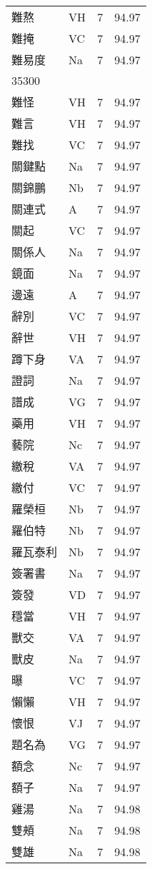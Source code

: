 \documentclass[twocolumn]{book}
\begin{document}
\begin{supertabular}{llrr}
難熬 & VH & 7 &  94.97\\
難掩 & VC & 7 &  94.97\\
難易度 & Na & 7 &  94.97\\
35300\\
難怪 & VH & 7 &  94.97\\
難言 & VH & 7 &  94.97\\
難找 & VC & 7 &  94.97\\
關鍵點 & Na & 7 &  94.97\\
關錦鵬 & Nb & 7 &  94.97\\
關連式 & A & 7 &  94.97\\
關起 & VC & 7 &  94.97\\
關係人 & Na & 7 &  94.97\\
鏡面 & Na & 7 &  94.97\\
邊遠 & A & 7 &  94.97\\
辭別 & VC & 7 &  94.97\\
辭世 & VH & 7 &  94.97\\
蹲下身 & VA & 7 &  94.97\\
證詞 & Na & 7 &  94.97\\
譜成 & VG & 7 &  94.97\\
藥用 & VH & 7 &  94.97\\
藝院 & Nc & 7 &  94.97\\
繳稅 & VA & 7 &  94.97\\
繳付 & VC & 7 &  94.97\\
羅榮桓 & Nb & 7 &  94.97\\
羅伯特 & Nb & 7 &  94.97\\
羅瓦泰利 & Nb & 7 &  94.97\\
簽署書 & Na & 7 &  94.97\\
簽發 & VD & 7 &  94.97\\
穩當 & VH & 7 &  94.97\\
獸交 & VA & 7 &  94.97\\
獸皮 & Na & 7 &  94.97\\
曝 & VC & 7 &  94.97\\
懶懶 & VH & 7 &  94.97\\
懷恨 & VJ & 7 &  94.97\\
題名為 & VG & 7 &  94.97\\
額念 & Nc & 7 &  94.97\\
額子 & Na & 7 &  94.97\\
雞湯 & Na & 7 &  94.98\\
雙頰 & Na & 7 &  94.98\\
雙雄 & Na & 7 &  94.98\\

\end{supertabular}
\end{document}
